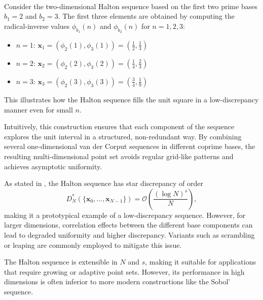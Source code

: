 \begin{example} \ \\
Consider the two-dimensional Halton sequence based on the first two prime bases $b_1 = 2$ and $b_2 = 3$. The first three elements are obtained by computing the radical-inverse values $\phi_{b_1}(n)$ and $\phi_{b_2}(n)$ for $n = 1, 2, 3$:

\begin{itemize}
    \item $n = 1$: $\boldsymbol{x}_1 = \left( \phi_2(1), \phi_3(1) \right) = \left( \tfrac{1}{2}, \tfrac{1}{3} \right)$
    \item $n = 2$: $\boldsymbol{x}_2 = \left( \phi_2(2), \phi_3(2) \right) = \left( \tfrac{1}{4}, \tfrac{2}{3} \right)$
    \item $n = 3$: $\boldsymbol{x}_3 = \left( \phi_2(3), \phi_3(3) \right) = \left( \tfrac{3}{4}, \tfrac{1}{9} \right)$
\end{itemize}

This illustrates how the Halton sequence fills the unit square in a low-discrepancy manner even for small $n$.
\end{example}








Intuitively, this construction ensures that each component of the sequence explores the unit interval in a structured, non-redundant way. By combining several one-dimensional van der Corput sequences in different coprime bases, the resulting multi-dimensional point set avoids regular grid-like patterns and achieves asymptotic uniformity.

As stated in \cite{pillichshammer2010zahlentheoretische}, the Halton sequence
has star discrepancy of order
\begin{equation*}
    D_N^*(\{\boldsymbol{x}_0, \dots, \boldsymbol{x}_{N-1}\}) = \mathcal{O}\left( \frac{(\log N)^s}{N} \right),
\end{equation*}
making it a prototypical example of a low-discrepancy sequence. However, for
larger dimensions, correlation effects between the different base components can
lead to degraded uniformity and higher discrepancy. Variants such as scrambling
or leaping are commonly employed to mitigate this issue.

\begin{remark}
The Halton sequence is extensible in $N$ and $s$, making it suitable for
applications that require growing or adaptive point sets. However, its
performance in high dimensions is often inferior to more modern constructions
like the Sobol' sequence.
\end{remark}


